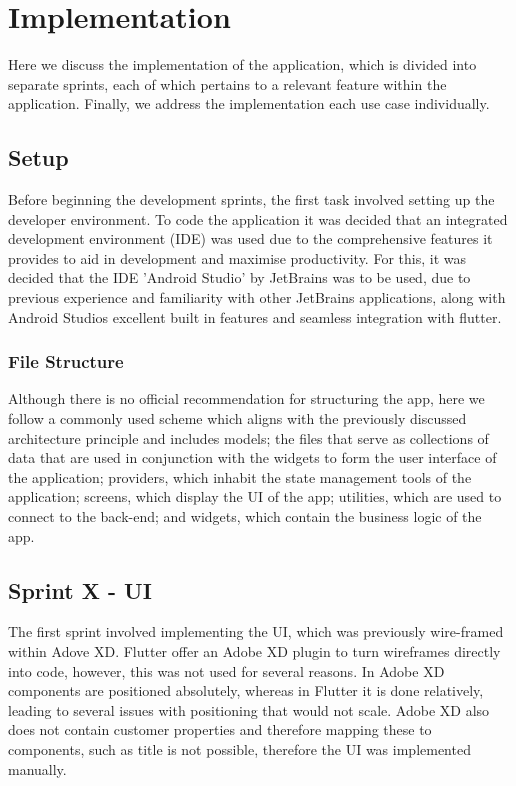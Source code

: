 \documentclass[12pt]{article}
\begin{document}
	\section{Implementation}
	Here we discuss the implementation of the application, which is divided into separate sprints, each of which pertains to a relevant feature within the application. Finally, we address the implementation each use case individually.
	
	\label{chap:implementation}
	\subsection{Setup}
	Before beginning the development sprints, the first task involved setting up the developer environment. To code the application it was decided that an integrated development environment (IDE) was used due to the comprehensive features it provides to aid in development and maximise productivity. For this, it was decided that the IDE 'Android Studio' by JetBrains \cite{DownloadAndroidStudio} was to be used, due to previous experience and familiarity with other JetBrains applications, along with Android Studios excellent built in features and seamless integration with flutter. 


	\subsubsection{File Structure}
	Although there is no official recommendation for structuring the app, here we follow a commonly used scheme which aligns with the previously discussed architecture principle and includes models; the files that serve as collections of data that are used in conjunction with the widgets to form the user interface of the application; providers, which inhabit the state management tools of the application; screens, which display the UI of the app; utilities, which are used to connect to the back-end; and widgets, which contain the business logic of the app.
	
	
	
	\subsection{Sprint X - UI}
	The first sprint involved implementing the UI, which was previously wire-framed within Adove XD. Flutter offer an Adobe XD plugin to turn wireframes directly into code, however, this was not used for several reasons. In Adobe XD components are positioned absolutely, whereas in Flutter it is done relatively, leading to several issues with positioning that would not scale. Adobe XD also does not contain customer properties and therefore mapping these to components, such as title is not possible, therefore the UI was implemented manually.
	
\end{document}
